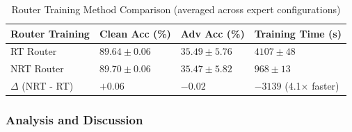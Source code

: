 \documentclass[11pt,a4paper]{article}
\begin{document}
\begin{table}[H]
\centering
\small
\begin{tabular}{llll}
\toprule
\textbf{Router Training} & \textbf{Clean Acc (\%)} & \textbf{Adv Acc (\%)} & \textbf{Training Time (s)} \\
\midrule
RT Router & $89.64 \pm 0.06$ & $35.49 \pm 5.76$ & $4107 \pm 48$ \\
NRT Router & $89.70 \pm 0.06$ & $35.47 \pm 5.82$ & $968 \pm 13$ \\
\midrule
$\Delta$ (NRT - RT) & $+0.06$ & $-0.02$ & $-3139$ (4.1$\times$ faster) \\
\bottomrule
\end{tabular}
\caption{Router Training Method Comparison (averaged across expert configurations)}
\end{table}

\subsubsection{Analysis and Discussion}
\end{document}
